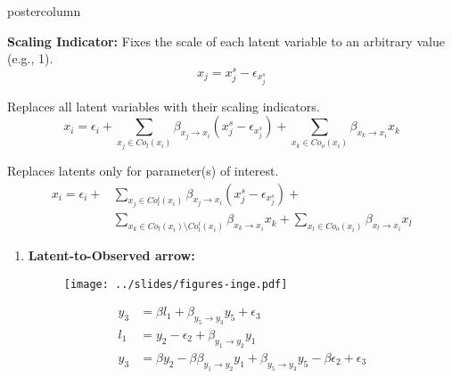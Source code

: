 \documentclass{beamer}
\begin{document}
\begin{frame}
\begin{columns}
\begin{column}{.33\textwidth}
\begin{beamercolorbox}[center]{postercolumn}
\begin{minipage}{.98\textwidth}
{\begin{myblock}{}
		\vspace{0.3em}
		\justifying \textbf{Scaling Indicator:} Fixes the scale of each latent variable to an arbitrary value (e.g., 1).
			$$ x_j = x_j^s - \epsilon_{x_j^s} $$

		\vspace{0.3em}
		\justifying \textbf{} Replaces all latent variables with their scaling indicators.
 			$$ x_i = \epsilon_i + \sum_{x_j \in Co_l(x_i)} \beta_{x_j \rightarrow x_i} (x_j^s - \epsilon_{x_j^s}) + \sum_{x_k \in Co_o(x_i)} \beta_{x_k \rightarrow x_i} x_k $$

		\vspace{0.3em}
		\justifying \textbf{} Replaces latents only for parameter(s) of interest.
			\begin{equation*}
			\begin{split}
				x_i = \epsilon_i + & \sum_{x_j \in Co_l^i(x_i)} \beta_{x_j \rightarrow x_i} (x_j^s - \epsilon_{x_j^s}) +  \\
						   & \sum_{x_k \in Co_l(x_i) \setminus Co_l^i(x_i)} \beta_{x_k \rightarrow x_i} x_k + \sum_{x_l \in Co_o(x_i)} \beta_{x_l \rightarrow x_i} x_l
			\end{split}
			\end{equation*}
	\end{myblock} \vfill
	\begin{myblock}{}
		\begin{enumerate}
			\item \textbf{Latent-to-Observed arrow:}
				\begin{figure}
					\centering
					\texttt{[image: ../slides/figures-inge.pdf]}
					\label{fig:l2o_lat_obs}
				\end{figure}
				\begin{equation*}
					\begin{split}
						y_3 &= \beta l_1 + \beta_{y_5 \to y_3} y_5 + \epsilon_3 \\
						l_1 &= y_2 - \epsilon_{2} + \beta_{y_1 \to y_2} y_1 \\
						y_3 &= \beta y_2 - \beta \beta_{y_1 \to y_2} y_1 + \beta_{y_5 \to y_3} y_5 - \beta \epsilon_2 + \epsilon_3\\
					\end{split}
				\end{equation*}
		\end{enumerate}
		\vspace{-0.25em}
	\end{myblock}\vfill
		}\end{minipage}\end{beamercolorbox}
	\end{column}


\end{columns}
\end{frame}
\end{document}
